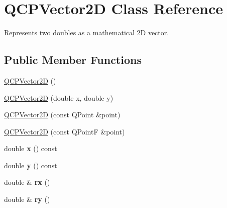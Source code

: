 \hypertarget{class_q_c_p_vector2_d}{}\section{Q\+C\+P\+Vector2D Class Reference}
\label{class_q_c_p_vector2_d}


Represents two doubles as a mathematical 2D vector.  


\subsection*{Public Member Functions}
\begin{DoxyCompactItemize}
\item 
\hyperlink{class_q_c_p_vector2_d_a04c90748c3623044c79fa20788ffbcc6}{Q\+C\+P\+Vector2D} ()
\item 
\hyperlink{class_q_c_p_vector2_d_a47bd86cebc5588dad6ec84349d9098d4}{Q\+C\+P\+Vector2D} (double x, double y)
\item 
\hyperlink{class_q_c_p_vector2_d_ad8f30a064dc37c90a7ba5e6732ceb5bb}{Q\+C\+P\+Vector2D} (const Q\+Point \&point)
\item 
\hyperlink{class_q_c_p_vector2_d_a3c16eba1006c210ffc3299253fef2339}{Q\+C\+P\+Vector2D} (const Q\+PointF \&point)
\item 
double {\bfseries x} () const \hypertarget{class_q_c_p_vector2_d_a731b487c2bf4afb5c51937619a27d49e}{}\label{class_q_c_p_vector2_d_a731b487c2bf4afb5c51937619a27d49e}

\item 
double {\bfseries y} () const \hypertarget{class_q_c_p_vector2_d_a9755d2fbdf959198b394b1ec5a7d022e}{}\label{class_q_c_p_vector2_d_a9755d2fbdf959198b394b1ec5a7d022e}

\item 
double \& {\bfseries rx} ()\hypertarget{class_q_c_p_vector2_d_a1516252dac9eb5ffb7ddb17fb26e60e0}{}\label{class_q_c_p_vector2_d_a1516252dac9eb5ffb7ddb17fb26e60e0}

\item 
double \& {\bfseries ry} ()\hypertarget{class_q_c_p_vector2_d_aa8f59a5b54aec8be8e4d1f39db892fea}{}\label{class_q_c_p_vector2_d_aa8f59a5b54aec8be8e4d1f39db892fea}


\end{DoxyCompactItemize}
